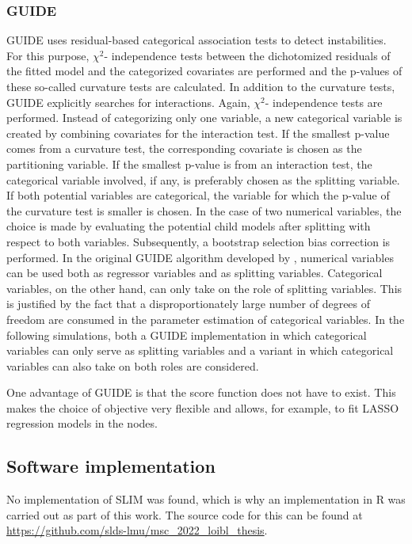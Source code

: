 \subsubsection{GUIDE}
GUIDE \citep{Loh.2002} uses residual-based categorical association tests to detect instabilities. For this purpose, $\chi^2$- independence tests between the dichotomized residuals of the fitted model and the categorized covariates are performed and the p-values of these so-called curvature tests are calculated. In addition to the curvature tests, GUIDE explicitly searches for interactions.  Again, $\chi^2$- independence tests are performed. Instead of categorizing only one variable, a new categorical variable is created by combining covariates for the interaction test. If the smallest p-value comes from a curvature test, the corresponding covariate is chosen as the partitioning variable. If the smallest p-value is from an interaction test, the categorical variable involved, if any, is preferably chosen as the splitting variable. If both potential variables are categorical, the variable for which the p-value of the curvature test is smaller is chosen. In the case of two numerical variables, the choice is made by evaluating the potential child models after splitting with respect to both variables.
Subsequently, a bootstrap selection bias correction is performed.
In the original GUIDE algorithm developed by \citep{Loh.2002}, numerical variables can be used both as regressor variables and as splitting variables. Categorical variables, on the other hand, can only take on the role of splitting variables. This is justified by the fact that a disproportionately large number of degrees of freedom are consumed in the parameter estimation of categorical variables.
In the following simulations, both a GUIDE implementation in which categorical variables can only serve as splitting variables and a variant in which categorical variables can also take on both roles are considered. 

One advantage of GUIDE is that the score function does not have to exist. This makes the choice of objective very flexible and allows, for example, to fit LASSO regression models  in the nodes.




\subsection{Software implementation}

No implementation of SLIM was found, which is why an implementation in R  \citep{RCoreTeam.2022} was carried out as part of this work. The source code for this can be found at \url{https://github.com/slds-lmu/msc_2022_loibl_thesis}. 

